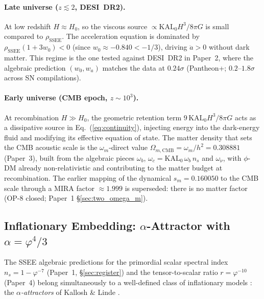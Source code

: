 \paragraph{Late universe ($z \lesssim 2$, DESI~DR2).}
At low redshift $H \approx H_{0}$, so the viscous source
$\propto \mathrm{KAL}_{0}H^{3}/8\pi G$ is small compared to
$\rho_{\mathrm{SSEE}}$.  The acceleration equation is dominated by
$\rho_{\mathrm{SSEE}}(1+3w_{0}) < 0$
(since $w_{0} \approx -0.840 < -1/3$), driving $\ddot{a} > 0$
without dark matter.  This regime is the one tested against DESI~DR2
in Paper~2, where the algebraic prediction $(w_{0},w_{a})$ matches
the data at $0.24\sigma$ (Pantheon+; $0.2$--$1.8\sigma$ across SN compilations).

\paragraph{Early universe (CMB epoch, $z \sim 10^{3}$).}
At recombination $H \gg H_{0}$, the geometric retention term
$9\,\mathrm{KAL}_{0}H^{3}/8\pi G$ acts as a dissipative source in
Eq.~(\ref{eq:continuity}), injecting energy into the dark-energy fluid
and modifying its effective equation of state.  The matter density that
sets the CMB acoustic scale is the $\omega_m$-direct value
$\Omega_{m,\mathrm{CMB}} = \omega_m/h^2 = 0.308881$ (Paper~3), built from the
algebraic pieces $\omega_b$, $\omega_c=\mathrm{KAL}_0\,\omega_b\,n_s$ and
$\omega_\nu$, with $\phi$-DM already non-relativistic and contributing to the
matter budget at recombination. The earlier mapping of the dynamical
$s_m=0.160050$ to the CMB scale through a MIRA factor
$\approx1.999$ is superseded: there is no matter factor (OP-8 closed; Paper~1
\S\ref{sec:two_omega_m}).

\subsection{Inflationary Embedding: \texorpdfstring{$\alpha$}{α}-Attractor with \texorpdfstring{$\alpha=\varphi^{4}/3$}{α=φ⁴/3}}
\label{sec:eft:inflation}

The SSEE algebraic predictions for the primordial scalar spectral index
$n_s = 1 - \varphi^{-7}$ (Paper~1, \S\ref{sec:register}) and the
tensor-to-scalar ratio $r = \varphi^{-10}$ (Paper~4) belong simultaneously
to a well-defined class of inflationary models \citep{Guth1981,Linde1982}: the
\emph{$\alpha$-attractors} of Kallosh \& Linde \citeyearpar{KalloshLinde2013}.

